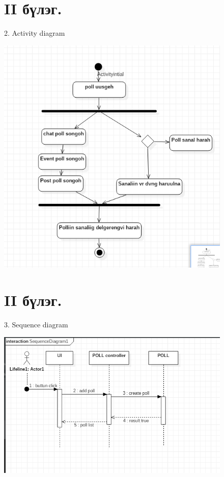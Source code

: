 \documentclass[12pt]{article}
\begin{document}
	\begin{figure}  \section       {II бүлэг.}  
			
		
		2.      Activity diagram	
		
			
			\centering
			\includegraphics[width=0.7\linewidth]{./a}
			\caption{}
			\label{fig:a}
		\end{figure}
	
	\begin{figure}  \section       {II бүлэг.}  
	
	
	    3.       Sequence diagram	
	
	
        	\centering
	        \includegraphics[width=0.7\linewidth]{./Sequ}
         	\caption{}
        	\label{fig:Sequ}
      \end{figure}
\end{document}
